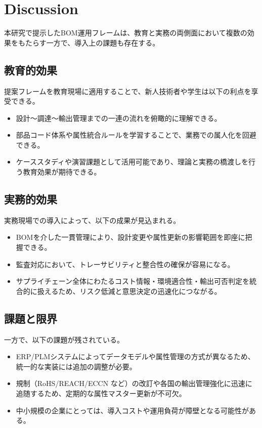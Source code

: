 \documentclass[10pt,conference]{IEEEtran}
\begin{document}
\section{Discussion}
本研究で提示したBOM運用フレームは、教育と実務の両側面において複数の効果をもたらす一方で、導入上の課題も存在する。

\subsection{教育的効果}
提案フレームを教育現場に適用することで、新人技術者や学生は以下の利点を享受できる。
\begin{itemize}
  \item 設計～調達～輸出管理までの一連の流れを俯瞰的に理解できる。
  \item 部品コード体系や属性統合ルールを学習することで、業務での属人化を回避できる。
  \item ケーススタディや演習課題として活用可能であり、理論と実務の橋渡しを行う教育効果が期待できる。
\end{itemize}

\subsection{実務的効果}
実務現場での導入によって、以下の成果が見込まれる。
\begin{itemize}
  \item BOMを介した一貫管理により、設計変更や属性更新の影響範囲を即座に把握できる。
  \item 監査対応において、トレーサビリティと整合性の確保が容易になる。
  \item サプライチェーン全体にわたるコスト情報・環境適合性・輸出可否判定を統合的に扱えるため、リスク低減と意思決定の迅速化につながる。
\end{itemize}

\subsection{課題と限界}
一方で、以下の課題が残されている。
\begin{itemize}
  \item ERP/PLMシステムによってデータモデルや属性管理の方式が異なるため、統一的な実装には追加の調整が必要。
  \item 規制（RoHS/REACH/ECCN など）の改訂や各国の輸出管理強化に迅速に追随するため、定期的な属性マスター更新が不可欠。
  \item 中小規模の企業にとっては、導入コストや運用負荷が障壁となる可能性がある。
\end{itemize}
\end{document}
